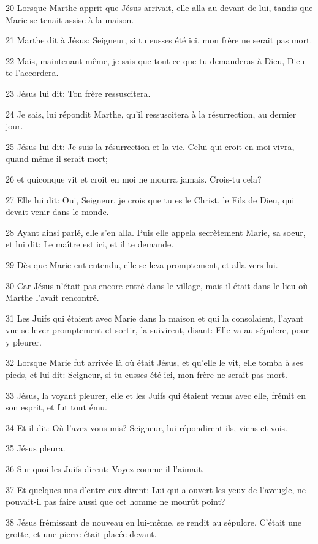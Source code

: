 \par 20 Lorsque Marthe apprit que Jésus arrivait, elle alla au-devant de lui, tandis que Marie se tenait assise à la maison.
\par 21 Marthe dit à Jésus: Seigneur, si tu eusses été ici, mon frère ne serait pas mort.
\par 22 Mais, maintenant même, je sais que tout ce que tu demanderas à Dieu, Dieu te l'accordera.
\par 23 Jésus lui dit: Ton frère ressuscitera.
\par 24 Je sais, lui répondit Marthe, qu'il ressuscitera à la résurrection, au dernier jour.
\par 25 Jésus lui dit: Je suis la résurrection et la vie. Celui qui croit en moi vivra, quand même il serait mort;
\par 26 et quiconque vit et croit en moi ne mourra jamais. Crois-tu cela?
\par 27 Elle lui dit: Oui, Seigneur, je crois que tu es le Christ, le Fils de Dieu, qui devait venir dans le monde.
\par 28 Ayant ainsi parlé, elle s'en alla. Puis elle appela secrètement Marie, sa soeur, et lui dit: Le maître est ici, et il te demande.
\par 29 Dès que Marie eut entendu, elle se leva promptement, et alla vers lui.
\par 30 Car Jésus n'était pas encore entré dans le village, mais il était dans le lieu où Marthe l'avait rencontré.
\par 31 Les Juifs qui étaient avec Marie dans la maison et qui la consolaient, l'ayant vue se lever promptement et sortir, la suivirent, disant: Elle va au sépulcre, pour y pleurer.
\par 32 Lorsque Marie fut arrivée là où était Jésus, et qu'elle le vit, elle tomba à ses pieds, et lui dit: Seigneur, si tu eusses été ici, mon frère ne serait pas mort.
\par 33 Jésus, la voyant pleurer, elle et les Juifs qui étaient venus avec elle, frémit en son esprit, et fut tout ému.
\par 34 Et il dit: Où l'avez-vous mis? Seigneur, lui répondirent-ils, viens et vois.
\par 35 Jésus pleura.
\par 36 Sur quoi les Juifs dirent: Voyez comme il l'aimait.
\par 37 Et quelques-uns d'entre eux dirent: Lui qui a ouvert les yeux de l'aveugle, ne pouvait-il pas faire aussi que cet homme ne mourût point?
\par 38 Jésus frémissant de nouveau en lui-même, se rendit au sépulcre. C'était une grotte, et une pierre était placée devant.

